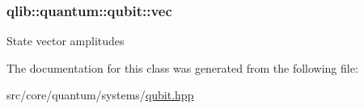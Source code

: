\subsubsection[{\texorpdfstring{vec}{vec}}]{ qlib\+::quantum\+::qubit\+::vec\hspace{0.3cm}{\ttfamily [private]}}\hypertarget{classqlib_1_1quantum_1_1qubit_a8f6e33dd5d0673f195360bc4b5c5442f}{}\label{classqlib_1_1quantum_1_1qubit_a8f6e33dd5d0673f195360bc4b5c5442f}
State vector amplitudes 

The documentation for this class was generated from the following file\+:\begin{DoxyCompactItemize}
\item 
src/core/quantum/systems/\hyperlink{qubit_8hpp}{qubit.\+hpp}\end{DoxyCompactItemize}

